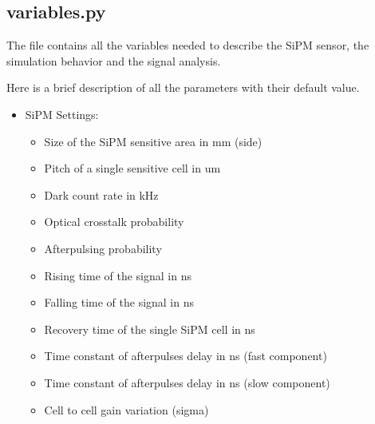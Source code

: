 \documentclass[letterpaper,10pt,english]{sphinxmanual}
\begin{document}
\subsection{variables.py}
\label{\detokenize{structure:variables-py}}
\begin{DUlineblock}{0em}
\item[] The file  contains all the variables needed to describe the SiPM sensor, the simulation behavior and the signal analysis.
\item[] Here is a brief description of all the parameters with their default value.
\end{DUlineblock}
\begin{itemize}
\item {} 
SiPM Settings:
\begin{itemize}
\item {} 
 Size of the SiPM sensitive area in mm (side)

\item {} 
 Pitch of a single sensitive cell in um

\item {} 
 Dark count rate in kHz

\item {} 
 Optical crosstalk probability

\item {} 
 Afterpulsing probability

\item {} 
 Rising time of the signal in ns

\item {} 
 Falling time of the signal in ns

\item {} 
 Recovery time of the single SiPM cell in ns

\item {} 
 Time constant of afterpulses delay in ns (fast component)

\item {} 
 Time constant of afterpulses delay in ns (slow component)

\item {} 
 Cell to cell gain variation (sigma)


\end{itemize}
\end{itemize}
\end{document}
